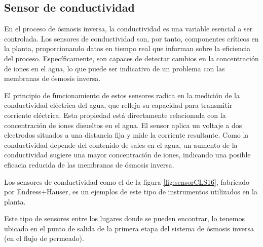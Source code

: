 \subsection{Sensor de conductividad} \label{sec:sesor_conductividad}

En el proceso de ósmosis inversa, la conductividad es una variable esencial a ser controlada. Los sensores de
conductividad son, por tanto, componentes críticos en la planta, proporcionando datos en tiempo real que informan
sobre la eficiencia del proceso. Específicamente, son capaces de detectar cambios en la concentración de iones
en el agua, lo que puede ser indicativo de un problema con las membranas de ósmosis inversa.

El principio de funcionamiento de estos sensores radica en la medición de la conductividad eléctrica del agua,
que refleja su capacidad para transmitir corriente eléctrica. Esta propiedad está directamente relacionada
con la concentración de iones disueltos en el agua. El sensor aplica un voltaje a dos electrodos situados a una
distancia fija y mide la corriente resultante. Como la conductividad depende del contenido de sales en el agua,
un aumento de la conductividad sugiere una mayor concentración de iones, indicando una posible eficacia reducida
de las membranas de ósmosis inversa.

Los sensores de conductividad como el de la figura \ref{fig:sensorCLS16}, fabricado por Endress+Hauser, es un  ejemplos de este tipo de
instrumentos utilizados en la planta.


Este tipo de sensores entre los lugares donde se pueden encontrar, lo tenemos ubicado en el punto de salida de la primera
etapa del sistema de ósmosis inversa (en el flujo de permeado).


